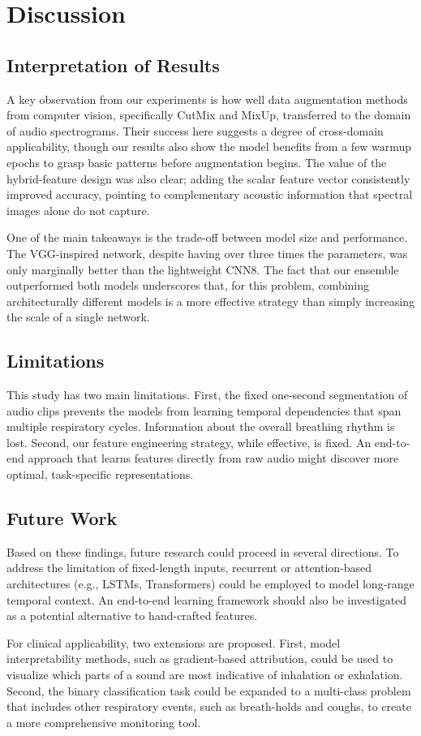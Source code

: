 \section{Discussion}

\subsection{Interpretation of Results}

A key observation from our experiments is how well data augmentation methods from computer vision, specifically CutMix and MixUp, transferred to the domain of audio spectrograms. Their success here suggests a degree of cross-domain applicability, though our results also show the model benefits from a few warmup epochs to grasp basic patterns before augmentation begins. The value of the hybrid-feature design was also clear; adding the scalar feature vector consistently improved accuracy, pointing to complementary acoustic information that spectral images alone do not capture.

One of the main takeaways is the trade-off between model size and performance. The VGG-inspired network, despite having over three times the parameters, was only marginally better than the lightweight CNN8. The fact that our ensemble outperformed both models underscores that, for this problem, combining architecturally different models is a more effective strategy than simply increasing the scale of a single network.

\subsection{Limitations}

This study has two main limitations. First, the fixed one-second segmentation of audio clips prevents the models from learning temporal dependencies that span multiple respiratory cycles. Information about the overall breathing rhythm is lost. Second, our feature engineering strategy, while effective, is fixed. An end-to-end approach that learns features directly from raw audio might discover more optimal, task-specific representations.

\subsection{Future Work}

Based on these findings, future research could proceed in several directions. To address the limitation of fixed-length inputs, recurrent or attention-based architectures (e.g., LSTMs, Transformers) could be employed to model long-range temporal context. An end-to-end learning framework should also be investigated as a potential alternative to hand-crafted features.

For clinical applicability, two extensions are proposed. First, model interpretability methods, such as gradient-based attribution, could be used to visualize which parts of a sound are most indicative of inhalation or exhalation. Second, the binary classification task could be expanded to a multi-class problem that includes other respiratory events, such as breath-holds and coughs, to create a more comprehensive monitoring tool.
